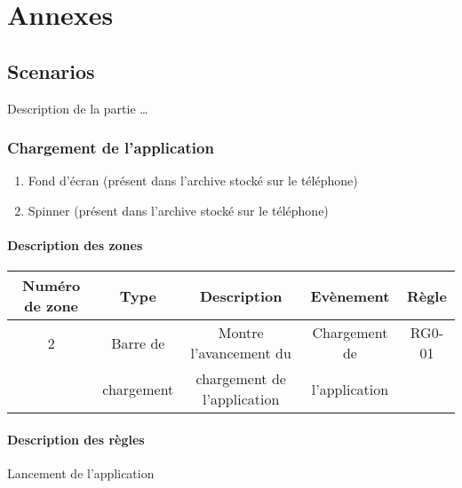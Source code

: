 \documentclass{report}
\begin{document}
\chapter{Annexes}

	\section{Scenarios}
	
		Description de la partie \ldots
		
		\newpage

\newpage
	
	\subsection{Chargement de l'application}
	
		\hypertarget{Chargement de l'application}{}
		\label{Chargement de l'application}

		\begin{center}
			
		\end{center}
		
		\begin{enumerate}
		  \item Fond d'écran (présent dans l'archive stocké sur le téléphone)
		  \item Spinner (présent dans l'archive stocké sur le téléphone)
		\end{enumerate}
		
		\subsubsection{Description des zones}

			\begin{tabular}{|c|c|c|c|c|} \hline
				Numéro de zone & Type  & Description & Evènement &	Règle \\\hline 
				2 & Barre de & Montre l'avancement du & Chargement de & RG0-01\\
				  & chargement & chargement de l'application & l'application &\\\hline
			\end{tabular}
		
		\subsubsection{Description des règles}
		Lancement de l’application 
		
\end{document}
